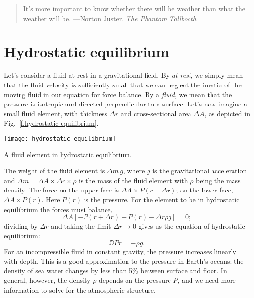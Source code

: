 
\begin{quote} It's more important to know whether there will be weather than what the weather will be. ---Norton Juster, \emph{The Phantom Tollbooth}\end{quote}

\section{Hydrostatic equilibrium}

Let's consider a fluid at rest in a gravitational field. By \emph{at rest}, we simply mean that the fluid velocity is sufficiently small that we can neglect the inertia of the moving fluid in our equation for force balance.  By a \emph{fluid}, we mean that the pressure is isotropic and directed perpendicular to a surface.  Let's now imagine a small fluid element, with thickness $\Delta r$ and cross-sectional area $\Delta A$, as depicted in Fig.~\ref{f.hydrostatic-equilibrium}.
\begin{marginfigure}
\texttt{[image: hydrostatic-equilibrium]}
\caption[A fluid element in hydrostatic equilibrium]{A fluid element in hydrostatic equilibrium.
\label{f.hydrostatic-equilibrium}}
\end{marginfigure}

The weight of the fluid element is $\Delta m \, g$, where $g$ is the gravitational acceleration and $\Delta m =  \Delta A\times\Delta r\times \rho$ is the mass of the fluid element with $\rho$ being the mass density.
The force on the upper face is $\Delta A\times P(r+\Delta r)$; on the lower face, $\Delta A\times P(r)$.  Here $P(r)$ is the pressure.  For the element to be in hydrostatic equilibrium the forces must balance,
\[
	\Delta A \left[ -P(r+\Delta r) + P(r) - \Delta r \rho g  \right] = 0;
\]
dividing by $\Delta r$ and taking the limit $\Delta r \to 0$ gives us the equation of hydrostatic equilibrium:
\begin{equation}\label{e.hydrostatic-equilibrium}
	\DD{P}{r} = -\rho g.
\end{equation}
For an incompressible fluid in constant gravity, the pressure increases linearly with depth. This is a good approximation to the pressure in Earth's oceans: the density of sea water changes by less than 5\% between surface and floor.  In general, however, the density $\rho$ depends on the pressure $P$, and we need more information to solve for the atmospheric structure.

